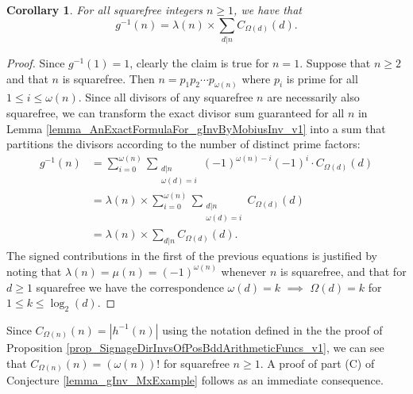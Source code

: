 \documentclass[11pt,reqno,a4letter]{article}
\numberwithin{figure}{section}
\numberwithin{table}{section}
\theoremstyle{plain}
\newtheorem{cor}[theorem]{Corollary}
\numberwithin{theorem}{section}
\theoremstyle{definition}
\begin{document}
\begin{cor} 
\label{cor_AnExactFormulaFor_gInvByMobiusInv_nSqFree_v2} 
For all squarefree integers $n \geq 1$, we have that 
\begin{equation} 
\label{eqn_gInvnSqFreeN_exactDivSum_Formula} 
g^{-1}(n) = \lambda(n) \times \sum_{d|n} C_{\Omega(d)}(d). 
\end{equation} 
\end{cor} 
\begin{proof} 
Since $g^{-1}(1) = 1$, clearly the claim is true for $n = 1$. Suppose that $n \geq 2$ and that 
$n$ is squarefree. Then $n = p_1p_2 \cdots p_{\omega(n)}$ where $p_i$ is prime for all 
$1 \leq i \leq \omega(n)$. Since all divisors of any squarefree $n$ are necessarily also squarefree, 
we can transform the exact divisor sum guaranteed for all $n$ in 
Lemma \ref{lemma_AnExactFormulaFor_gInvByMobiusInv_v1} into a sum that partitions the divisors 
according to the number of distinct prime factors: 
\begin{align*} 
g^{-1}(n) & = \sum_{i=0}^{\omega(n)} \sum_{\substack{d|n \\ \omega(d)=i}} (-1)^{\omega(n) - i} (-1)^{i} \cdot 
     C_{\Omega(d)}(d) \\ 
     & = \lambda(n) \times \sum_{i=0}^{\omega(n)} \sum_{\substack{d|n \\ \omega(d)=i}} C_{\Omega(d)}(d) \\ 
     & = \lambda(n) \times \sum_{d|n} C_{\Omega(d)}(d). 
\end{align*} 
The signed contributions in the first of the previous equations is 
justified by noting that $\lambda(n) = \mu(n) = (-1)^{\omega(n)}$ 
whenever $n$ is squarefree, and that for $d \geq 1$
squarefree we have the correspondence 
$\omega(d) = k$ $\implies$ $\Omega(d) = k$ for $1 \leq k \leq \log_2(d)$. 
\end{proof} 

Since $C_{\Omega(n)}(n) = |h^{-1}(n)|$ using the notation defined in the the proof of 
Proposition \ref{prop_SignageDirInvsOfPosBddArithmeticFuncs_v1}, we can see that 
$C_{\Omega(n)}(n) = (\omega(n))!$ for squarefree $n \geq 1$. 
A proof of part (C) of Conjecture \ref{lemma_gInv_MxExample} 
follows as an immediate consequence. 
\end{document}
